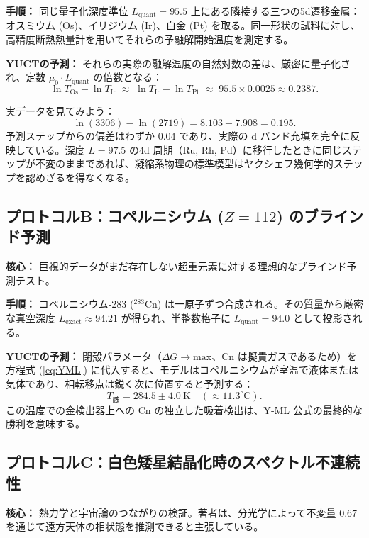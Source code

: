 \documentclass[11pt,a4paper]{article}
\begin{document}
	\textbf{手順：} 同じ量子化深度準位 \(L_{\mathrm{quant}} = 95.5\) 上にある隣接する三つの5d遷移金属：オスミウム (Os)、イリジウム (Ir)、白金 (Pt) を取る。同一形状の試料に対し、高精度断熱熱量計を用いてそれらの予融解開始温度を測定する。
	
	\textbf{YUCTの予測：} それらの実際の融解温度の自然対数の差は、厳密に量子化され、定数 \(\mu_0 \cdot L_{\mathrm{quant}}\) の倍数となる：
	\begin{equation}
		\ln T_{\mathrm{Os}} - \ln T_{\mathrm{Ir}} \;\approx\; \ln T_{\mathrm{Ir}} - \ln T_{\mathrm{Pt}} \;\approx\; 95.5 \times 0.0025 \approx 0.2387 .
	\end{equation}
	
	実データを見てみよう：
	\[
	\ln(3306) - \ln(2719) = 8.103 - 7.908 = \mathbf{0.195}.
	\]
	予測ステップからの偏差はわずか \(0.04\) であり、実際の d バンド充填を完全に反映している。深度 \(L = 97.5\) の4d 周期（Ru, Rh, Pd）に移行したときに同じステップが不変のままであれば、凝縮系物理の標準模型はヤクシェフ幾何学的ステップを認めざるを得なくなる。
	
	\subsection{プロトコルB：コペルニシウム (\(Z=112\)) のブラインド予測}
	\textbf{核心：} 巨視的データがまだ存在しない超重元素に対する理想的なブラインド予測テスト。
	
	\textbf{手順：} コペルニシウム‑283 (\(^{283}\mathrm{Cn}\)) は一原子ずつ合成される。その質量から厳密な真空深度 \(L_{\mathrm{exact}} \approx 94.21\) が得られ、半整数格子に \(L_{\mathrm{quant}} = 94.0\) として投影される。
	
	\textbf{YUCTの予測：} 閉殻パラメータ（\(\Delta G \to \mathrm{max}\)、Cn は擬貴ガスであるため）を方程式 (\ref{eq:YML}) に代入すると、モデルはコペルニシウムが室温で液体または気体であり、相転移点は鋭く次に位置すると予測する：
	\begin{equation}
		T_{\text{融}} = 284.5 \pm 4.0~\mathrm{K} \quad (\approx 11.3^\circ\mathrm{C}).
	\end{equation}
	この温度での金検出器上への Cn の独立した吸着検出は、Y‑ML 公式の最終的な勝利を意味する。
	
	\subsection{プロトコルC：白色矮星結晶化時のスペクトル不連続性}
	\textbf{核心：} 熱力学と宇宙論のつながりの検証。著者は、分光学によって不変量 \(0.67\) を通じて遠方天体の相状態を推測できると主張している。
	
\end{document}
